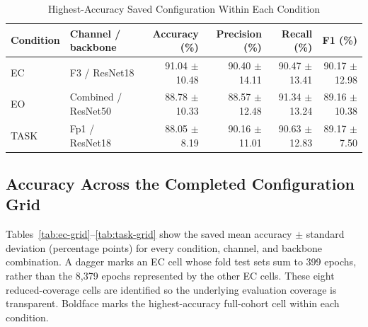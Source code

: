 \documentclass[conference]{IEEEtran}
\begin{document}
\begin{table}[t]
\caption{Highest-Accuracy Saved Configuration Within Each Condition}
\label{tab:best}
\centering
\small
\begin{tabular}{llrrrr}
\toprule
\textbf{Condition} & \textbf{Channel / backbone} &
\textbf{Accuracy (\%)} & \textbf{Precision (\%)} &
\textbf{Recall (\%)} & \textbf{F1 (\%)} \\
\midrule
EC   & F3 / ResNet18 &
91.04 $\pm$ 10.48 & 90.40 $\pm$ 14.11 &
90.47 $\pm$ 13.41 & 90.17 $\pm$ 12.98 \\
EO   & Combined / ResNet50 &
88.78 $\pm$ 10.33 & 88.57 $\pm$ 12.48 &
91.34 $\pm$ 13.24 & 89.16 $\pm$ 10.38 \\
TASK & Fp1 / ResNet18 &
88.05 $\pm$ 8.19 & 90.16 $\pm$ 11.01 &
90.63 $\pm$ 12.83 & 89.17 $\pm$ 7.50 \\
\bottomrule
\end{tabular}
\end{table}

\subsection{Accuracy Across the Completed Configuration Grid}
Tables~\ref{tab:ec-grid}--\ref{tab:task-grid} show the saved mean
accuracy $\pm$ standard deviation (percentage points) for every
condition, channel, and backbone combination. A dagger marks an EC
cell whose fold test sets sum to 399 epochs, rather than the 8,379
epochs represented by the other EC cells. These eight reduced-coverage
cells are identified so the underlying evaluation coverage is
transparent. Boldface marks the highest-accuracy full-cohort cell within
each condition.
\end{document}

